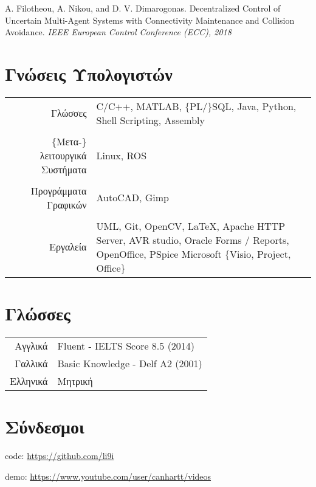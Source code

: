 \documentclass[a4paper,10pt,twoside]{article}
\begin{document}
A. Filotheou, A. Nikou, and D. V. Dimarogonas. Decentralized Control of Uncertain
Multi-Agent Systems with Connectivity Maintenance and Collision Avoidance.
\textit{IEEE European Control Conference (ECC), 2018}





\section{Γνώσεις Υπολογιστών}

\begin{tabular}{rp{9cm}}
Γλώσσες & C/C++, MATLAB, $\{$PL/$\}$SQL, Java, Python, Shell Scripting, Assembly \\
&\\
$\{$Μετα-$\}$λειτουργικά Συστήματα & Linux, ROS \\
&\\
Προγράμματα Γραφικών & AutoCAD, Gimp\\
&\\
Εργαλεία & UML, Git, OpenCV, \LaTeX, Apache HTTP Server, AVR studio,
   Oracle Forms / Reports, OpenOffice, PSpice
   Microsoft $\{$Visio, Project, Office$\}$
\end{tabular}



\section{Γλώσσες}

\begin{tabular}{rp{12cm}}
Αγγλικά & Fluent - IELTS Score 8.5 (2014) \\
Γαλλικά & Basic Knowledge - Delf A2 (2001) \\
Ελληνικά & Μητρική
\end{tabular}



\section{Σύνδεσμοι}
code: \url{https://github.com/li9i}

demo: \url{https://www.youtube.com/user/canhartt/videos}
\end{document}
